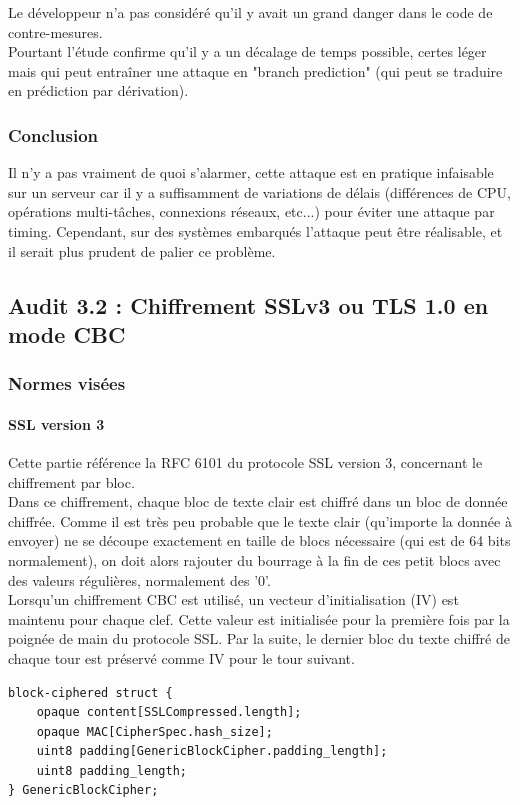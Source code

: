 Le développeur n'a pas considéré qu'il y avait un grand danger dans le code de contre-mesures.\\
Pourtant l'étude confirme qu'il y a un décalage de temps possible, certes léger mais qui peut entraîner une attaque en "branch prediction" (qui peut se traduire en prédiction par dérivation).\\

\subsubsection{Conclusion}

Il n'y a pas vraiment de quoi s'alarmer, cette attaque est en pratique infaisable sur un serveur car il y a suffisamment de variations de délais (différences de CPU, opérations multi-tâches, connexions réseaux, etc...) pour éviter une attaque par timing. Cependant, sur des systèmes embarqués l'attaque peut être réalisable, et il serait plus prudent de palier ce problème.

\subsection{Audit 3.2 : Chiffrement SSLv3 ou TLS 1.0 en mode CBC}
\subsubsection{Normes visées}

\paragraph{SSL version 3 \\}
Cette partie référence la RFC 6101 \cite{rfc6101} du protocole SSL version 3, concernant le chiffrement par bloc. \\
Dans ce chiffrement, chaque bloc de texte clair est chiffré dans un bloc de donnée chiffrée. Comme il est très peu probable que le texte clair (qu'importe la donnée à envoyer) ne se découpe exactement en taille de blocs nécessaire (qui est de 64 bits normalement), on doit alors rajouter du bourrage à la fin de ces petit blocs avec des valeurs régulières, normalement des '0'. \\

Lorsqu'un chiffrement CBC est utilisé, un vecteur d'initialisation (IV) est maintenu pour chaque clef. Cette valeur est initialisée pour la première fois par la poignée de main du protocole SSL. Par la suite, le dernier bloc du texte chiffré de chaque tour est préservé comme IV pour le tour suivant.\\
\newpage
\begin{verbatim} 
block-ciphered struct {
    opaque content[SSLCompressed.length];
    opaque MAC[CipherSpec.hash_size];
    uint8 padding[GenericBlockCipher.padding_length];
    uint8 padding_length;
} GenericBlockCipher;
\end{verbatim}

